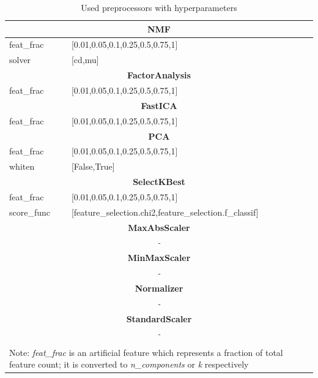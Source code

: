 {\footnotesize
\begin{longtable}{l l}

\caption{Used preprocessors with hyperparameters} \label{tab:prepro} \\

\midrule
\multicolumn{2}{c}{\textbf{NMF}} \\*
\midrule

feat\_frac & [0.01,0.05,0.1,0.25,0.5,0.75,1] \\
solver & [cd,mu] \\

\midrule
\multicolumn{2}{c}{\textbf{FactorAnalysis}} \\*
\midrule

feat\_frac & [0.01,0.05,0.1,0.25,0.5,0.75,1] \\

\midrule
\multicolumn{2}{c}{\textbf{FastICA}} \\*
\midrule

feat\_frac & [0.01,0.05,0.1,0.25,0.5,0.75,1] \\

\midrule
\multicolumn{2}{c}{\textbf{PCA}} \\*
\midrule

feat\_frac & [0.01,0.05,0.1,0.25,0.5,0.75,1] \\
whiten & [False,True] \\

\midrule
\multicolumn{2}{c}{\textbf{SelectKBest}} \\*
\midrule

feat\_frac & [0.01,0.05,0.1,0.25,0.5,0.75,1] \\
score\_func & [feature\_selection.chi2,feature\_selection.f\_classif] \\

\midrule
\multicolumn{2}{c}{\textbf{MaxAbsScaler}} \\*
\midrule
\multicolumn{2}{c}{\textit{-}} \\

\midrule
\multicolumn{2}{c}{\textbf{MinMaxScaler}} \\*
\midrule
\multicolumn{2}{c}{\textit{-}} \\

\midrule
\multicolumn{2}{c}{\textbf{Normalizer}} \\*
\midrule
\multicolumn{2}{c}{\textit{-}} \\

\midrule
\multicolumn{2}{c}{\textbf{StandardScaler}} \\*
\midrule
\multicolumn{2}{c}{\textit{-}} \\

\bottomrule \\[-8pt]
\multicolumn{2}{p{0.8\linewidth}}{Note: \emph{feat\_frac} is an artificial
feature which represents a fraction of total feature count; it is converted
to \emph{n\_components} or \emph{k} respectively}

\end{longtable}
}


